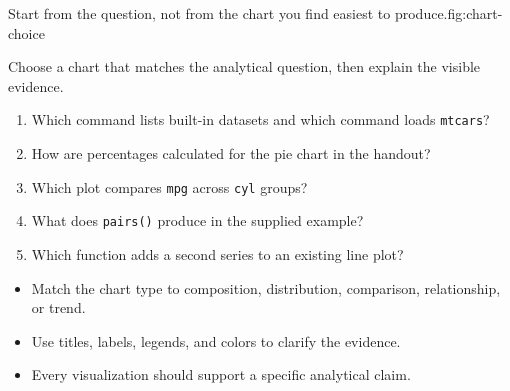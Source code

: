 \begin{utpfig}{Start from the question, not from the chart you
find easiest to produce.}{fig:chart-choice}
\end{utpfig}

Choose a chart that matches the analytical question, then explain the visible evidence.

\begin{quickcheck}
\begin{enumerate}
  \item Which command lists built-in datasets and which command loads \texttt{mtcars}?
  \item How are percentages calculated for the pie chart in the handout?
  \item Which plot compares \texttt{mpg} across \texttt{cyl} groups?
  \item What does \texttt{pairs()} produce in the supplied example?
  \item Which function adds a second series to an existing line plot?
\end{enumerate}
\end{quickcheck}

\begin{chapterrecap}
\begin{itemize}
  \item Match the chart type to composition, distribution, comparison, relationship, or trend.
  \item Use titles, labels, legends, and colors to clarify the evidence.
  \item Every visualization should support a specific analytical claim.
\end{itemize}
\end{chapterrecap}
